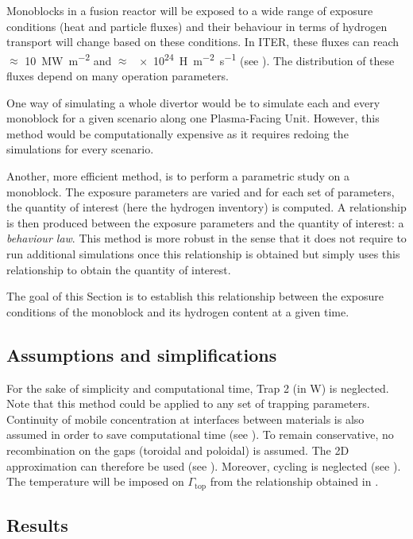 Monoblocks in a fusion reactor will be exposed to a wide range of exposure conditions (heat and particle fluxes) and their behaviour in terms of hydrogen transport will change based on these conditions.
In ITER, these fluxes can reach $\approx$ \SI{10}{MW.m^{-2}} and $\approx$ \SI{e24}{H.m^{-2}.s^{-1}} (see ).
The distribution of these fluxes depend on many operation parameters.

One way of simulating a whole divertor would be to simulate each and every monoblock for a given scenario along one Plasma-Facing Unit.
However, this method would be computationally expensive as it requires redoing the simulations for every scenario.

Another, more efficient method, is to perform a parametric study on a monoblock.
The exposure parameters are varied and for each set of parameters, the quantity of interest (here the hydrogen inventory) is computed.
A relationship is then produced between the exposure parameters and the quantity of interest: a \textit{behaviour law}.
This method is more robust in the sense that it does not require to run additional simulations once this relationship is obtained but simply uses this relationship to obtain the quantity of interest.

The goal of this Section is to establish this relationship between the exposure conditions of the monoblock and its hydrogen content at a given time.

\subsection{Assumptions and simplifications}

For the sake of simplicity and computational time, Trap 2 (in W) is neglected.
Note that this method could be applied to any set of trapping parameters.
Continuity of mobile concentration at interfaces between materials is also assumed in order to save computational time (see ).
To remain conservative, no recombination on the gaps (toroidal and poloidal) is assumed.
The 2D approximation can therefore be used (see ).
Moreover, cycling is neglected (see ).
The temperature will be imposed on $\Gamma_\mathrm{top}$ from the relationship obtained in .


\subsection{Results}


